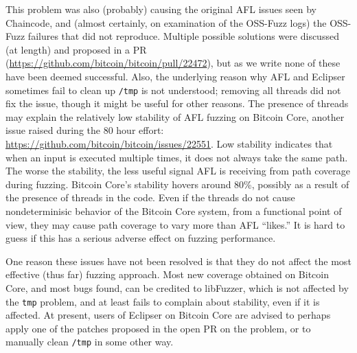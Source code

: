 This problem was also (probably) causing the original AFL issues seen
by Chaincode, and (almost certainly, on examination of  the OSS-Fuzz
logs) the OSS-Fuzz failures that did not reproduce.  Multiple possible
solutions were discussed (at length) and proposed in a PR
(\url{https://github.com/bitcoin/bitcoin/pull/22472}), but as we write
none of these have been deemed successful.  Also, the underlying
reason why AFL and Eclipser sometimes fail to clean up {\tt /tmp} is
not understood; removing all threads did not fix the issue, though it
might be useful for other reasons.  The presence of threads may
explain the relatively low stability of AFL fuzzing on Bitcoin Core,
another issue raised during the 80 hour effort:
\url{https://github.com/bitcoin/bitcoin/issues/22551}.  Low stability
indicates that when an input is executed multiple times, it does not
always take the same path.  The worse the stability, the less useful signal
AFL is receiving from path coverage during fuzzing.  Bitcoin Core's
stability hovers around 80\%, possibly as a result of the presence of
threads in the code.  Even if the threads do not cause nondeterminisic
behavior of the Bitcoin Core system, from a functional point of view,
they may cause path coverage to vary more than AFL ``likes.''  It is
hard to guess if this has a serious adverse effect on fuzzing
performance.

One reason these issues have not been resolved is that they do not
affect the most effective (thus far) fuzzing approach.  Most new
coverage obtained on Bitcoin Core, and most bugs found, can be
credited to libFuzzer, which is not affected by the {\tt tmp} problem,
and at least fails to complain about stability, even if it is
affected.  At present, users of Eclipser on Bitcoin Core are advised
to perhaps apply one of the patches proposed in the open PR on the
problem, or to manually clean {\tt /tmp} in some other way.
